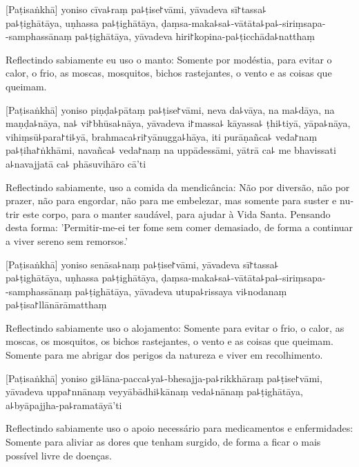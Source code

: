 [Paṭisaṅkhā] yoniso cīva꜕raṃ pa꜕ṭise꜓vāmi, yāvadeva sī꜓tassa꜕\\
pa꜕ṭighātāya, uṇhassa pa꜕ṭighātāya, ḍaṃsa-maka꜕sa꜕-vātāta꜕pa꜕-siriṃsapa-\\
-samphassānaṃ pa꜕ṭighātāya, yāvadeva hiri꜓kopina-pa꜕ṭicchāda꜕natthaṃ

\begin{english}
  Reflectindo sabiamente eu uso o manto: Somente por modéstia, para evitar o
  calor, o frio, as moscas, mosquitos, bichos rastejantes, o vento e as coisas
  que queimam.
\end{english}

[Paṭisaṅkhā] yoniso piṇḍa꜕pātaṃ pa꜕ṭise꜓vāmi, neva da꜕vāya, na ma꜕dāya, na maṇḍa꜕nāya, na꜕ vi꜓bhūsa꜕nāya, yāvadeva i꜓massa꜕ kāyassa꜕ ṭhi꜕tiyā, yāpa꜕nāya, vihiṃsū꜕para꜓ti꜕yā, brahmaca꜕ri꜓yānugga꜕hāya, iti purāṇañca꜕ veda꜓naṃ pa꜕ṭiha꜓ṅkhāmi, navañca꜕ veda꜓naṃ na uppādessāmi, yātrā ca꜕ me bhavissati a꜕navajjatā ca꜕ phāsuvihāro cā'ti

\begin{english}
  Reflectindo sabiamente, uso a comida da mendicância: Não por diversão, não por
  prazer, não para engordar, não para me embelezar, mas somente para suster e
  nutrir este corpo, para o manter saudável, para ajudar à Vida Santa. Pensando
  desta forma: 'Permitir-me-ei ter fome sem comer demasiado, de forma a
  continuar a viver sereno sem remorsos.'
\end{english}

[Paṭisaṅkhā] yoniso senāsa꜕naṃ pa꜕ṭise꜓vāmi, yāvadeva sī꜓tassa꜕\\
pa꜕ṭighātāya, uṇhassa pa꜕ṭighātāya, ḍaṃsa-maka꜕sa꜕-vātāta꜕pa꜕-siriṃsapa-\\
-samphassānaṃ pa꜕ṭighātāya, yāvadeva utupa꜕rissaya vi꜕nodanaṃ pa꜕ṭisa꜓llānārāmatthaṃ

\begin{english}
  Reflectindo sabiamente uso o alojamento: Somente para evitar o frio, o calor,
  as moscas, os mosquitos, os bichos rastejantes, o vento e as coisas que
  queimam. Somente para me abrigar dos perigos da natureza e viver em
  recolhimento.
\end{english}

[Paṭisaṅkhā] yoniso gi꜕lāna-pacca꜕ya꜕-bhesajja-pa꜕rikkhāraṃ pa꜕ṭise꜓vāmi, yāvadeva uppa꜓nnānaṃ veyyābādhi꜕kānaṃ veda꜕nānaṃ pa꜕ṭighātāya, a꜕byāpajjha-pa꜕ramatāyā'ti

\begin{english}
  Reflectindo sabiamente uso o apoio necessário para medicamentos e
  enfermidades: Somente para aliviar as dores que tenham surgido, de forma a
  ficar o mais possível livre de doenças.
\end{english}

